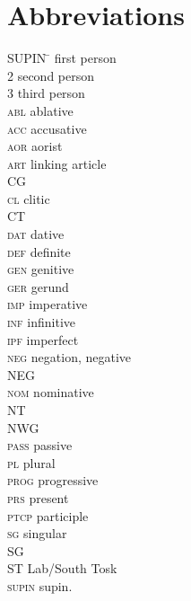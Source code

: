 \documentclass[output=paper]{langsci/langscibook}
\begin{document}
\section*{Abbreviations}
\begin{multicols}{2}
\begin{tabbing}
SUPIN\hspace{1ex} \=                \> first person\\
2               \> second person\\
3               \> third person\\
\textsc{abl}    \> ablative\\
\textsc{acc}    \> accusative\\
\textsc{aor}    \> aorist\\
\textsc{art}    \> linking article\\
CG              \> \\ 
\textsc{cl}     \> clitic\\
CT              \> \\
\textsc{dat}    \> dative\\
\textsc{def}    \> definite\\
\textsc{gen}    \> genitive\\
\textsc{ger}    \> gerund\\
\textsc{imp}    \> imperative\\
\textsc{inf}    \> infinitive\\
\textsc{ipf}    \> imperfect\\
\textsc{neg}    \> negation, negative\\
NEG             \> \\
\textsc{nom}    \> nominative\\
NT              \> \\
NWG             \> \\
\textsc{pass}   \> passive\\
\textsc{pl}     \> plural\\
\textsc{prog}   \> progressive\\
\textsc{prs}    \> present\\
\textsc{ptcp}   \> participle\\
\textsc{sg}     \> singular\\
SG              \> \\
ST              \> Lab/South Tosk\\
\textsc{supin}  \> supin.
\end{tabbing}
\end{multicols} 
 
{\sloppy\printbibliography[heading=subbibliography,notkeyword=this]}
\end{document}
